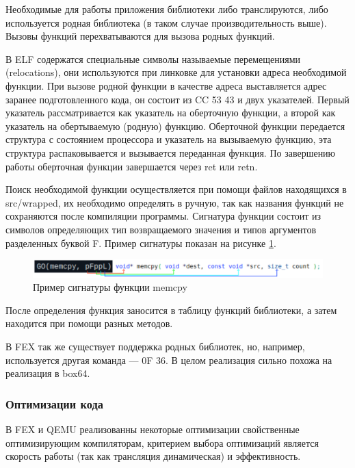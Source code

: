 Необходимые для работы приложения библиотеки либо транслируются, либо используется родная библиотека (в таком случае производительность выше). Вызовы функций перехватываются для вызова родных функций. 

В ELF содержатся специальные символы называемые перемещениями (relocations), они используются при линковке для установки адреса необходимой функции. При вызове родной функции в качестве адреса выставляется адрес заранее подготовленного кода, он состоит из CC 53 43 и двух указателей. Первый указатель рассматривается как указатель на оберточную функции, а второй как указатель на обертываемую (родную) функцию. Оберточной функции передается структура с состоянием процессора и указатель на вызываемую функцию, эта структура распаковывается и вызывается переданная функция. По завершению работы оберточная функции завершается через ret или retn.

Поиск необходимой функции осуществляется при помощи файлов находящихся в src/wrapped, их необходимо определять в ручную, так как названия функций не сохраняются после компиляции программы. Сигнатура функции состоит из символов определяющих тип возвращаемого значения и типов аргументов разделенных буквой F. Пример сигнатуры показан на рисунке \ref{fig:box64sig}.

\begin{figure}[hbtp]
	\centering
	\includegraphics[width=\textwidth]{img/box64_sig.png}
	\caption{Пример сигнатуры функции memcpy}
	\label{fig:box64sig}
\end{figure}

После определения функция заносится в таблицу функций библиотеки, а затем находится при помощи разных методов. \cite{box64_deep}

В FEX так же существует поддержка родных библиотек, но, например, используется другая команда --- 0F 36. В целом реализация сильно похожа на реализация в box64.

\subsubsection{Оптимизации кода}

В FEX и QEMU реализованны некоторые оптимизации свойственные оптимизирующим компиляторам, критерием выбора оптимизаций является скорость работы (так как трансляция динамическая) и эффективность.

